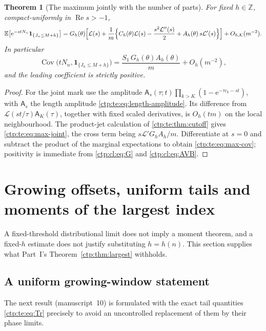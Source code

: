 \documentclass[11pt,a4paper]{article}
\numberwithin{equation}{section}
\newtheorem{theorem}{Theorem}[section]
\theoremstyle{definition}
\theoremstyle{remark}
\newcommand{\Z}{\mathbb Z}
\newcommand{\e}{\mathrm e}
\DeclareMathOperator{\Rea}{Re}
\newcommand{\E}{\mathbb E}
\DeclareMathOperator{\Cov}{Cov}
\newcommand{\ind}{\mathbf 1}
\newcommand{\LW}{\mathcal L}
\newcommand{\amp}{\mathsf A}
\begin{document}
\begin{theorem}[The maximum jointly with the number of parts]\label{ctp:te:thm:maxjoint}
For fixed $h\in\Z$, compact-uniformly in $\Rea s>-1$,
\begin{equation}\label{ctp:te:eq:max-joint}
 \E\bigl[\e^{-stN_n}\ind_{\{J_n\le M+h\}}\bigr]=G_h(\theta)\Bigl[\LW(s)+\frac1m
 \Bigl\{C_h(\theta)\LW(s)-\frac{s^2\LW''(s)}2+A_h(\theta)\,s\LW'(s)\Bigr\}\Bigr]
 +O_{h,\mathcal K}(m^{-2}).
\end{equation}
In particular
\begin{equation}\label{ctp:te:eq:max-cov}
 \Cov\bigl(tN_n,\ind_{\{J_n\le M+h\}}\bigr)=\frac{S_1\,G_h(\theta)A_h(\theta)}m+O_h(m^{-2}),
\end{equation}
and the leading coefficient is strictly positive.
\end{theorem}
\begin{proof}
For the joint mark use the amplitude
$\amp_s(\tau;t)\prod_{k>K}(1-\e^{-\tau c_k-st})$, with $\amp_s$ the length
amplitude \eqref{ctp:te:eq:length-amplitude}. Its difference from
$\LW(st/\tau)\amp_K(\tau)$, together with fixed scaled derivatives, is
$O_h(tm)$ on the local neighbourhood. The product-jet calculation of
\cref{ctp:te:thm:cutoff} gives \eqref{ctp:te:eq:max-joint}, the cross term
being $s\LW'G_hA_h/m$. Differentiate at $s=0$ and subtract the product of
the marginal expectations to obtain \eqref{ctp:te:eq:max-cov}; positivity is
immediate from \eqref{ctp:cl:eq:G} and \eqref{ctp:cl:eq:AVB}.
\end{proof}

\section{Growing offsets, uniform tails and moments of the largest index}
\label{ctp:cl:sec:moments}

A fixed-threshold distributional limit does not imply a moment theorem, and
a fixed-$h$ estimate does not justify substituting $h=h(n)$. This section
supplies what Part~I's Theorem~\ref{ctp:thm:largest} withholds.

\subsection{A uniform growing-window statement}
The next result (manuscript~10) is formulated with the exact tail
quantities \eqref{ctp:te:eq:Tr} precisely to avoid an uncontrolled
replacement of them by their phase limits.
\end{document}
